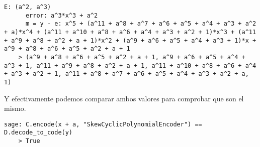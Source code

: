 \begin{example}
\begin{lstlisting}[gobble=4, basicstyle=\small\ttfamily]
      E: (a^2, a^3)
      error: a^3*x^3 + a^2
      m = y - e: x^5 + (a^11 + a^8 + a^7 + a^6 + a^5 + a^4 + a^3 + a^2 + a)*x^4 + (a^11 + a^10 + a^8 + a^6 + a^4 + a^3 + a^2 + 1)*x^3 + (a^11 + a^9 + a^8 + a^2 + a + 1)*x^2 + (a^9 + a^6 + a^5 + a^4 + a^3 + 1)*x + a^9 + a^8 + a^6 + a^5 + a^2 + a + 1
    > (a^9 + a^8 + a^6 + a^5 + a^2 + a + 1, a^9 + a^6 + a^5 + a^4 + a^3 + 1, a^11 + a^9 + a^8 + a^2 + a + 1, a^11 + a^10 + a^8 + a^6 + a^4 + a^3 + a^2 + 1, a^11 + a^8 + a^7 + a^6 + a^5 + a^4 + a^3 + a^2 + a, 1)
  \end{lstlisting}
  Y efectivamente podemos comparar ambos valores para comprobar que son el mismo.
  \begin{lstlisting}[gobble=4]
    sage: C.encode(x + a, "SkewCyclicPolynomialEncoder") == D.decode_to_code(y)
    > True
  \end{lstlisting}

\end{example}